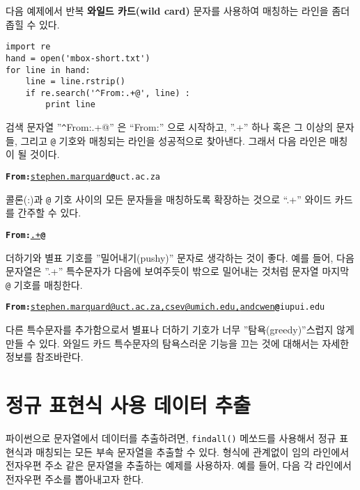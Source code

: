 다음 예제에서 반복 {\bf 와일드 카드(wild card)} 문자를 사용하여 매칭하는 라인을 좀더 좁힐 수 있다.

\beforeverb
\begin{verbatim}
import re
hand = open('mbox-short.txt')
for line in hand:
    line = line.rstrip()
    if re.search('^From:.+@', line) :
        print line
\end{verbatim}
\afterverb
%

검색 문자열 ''{\verb"^"}From:.+@'' 은 ``From:'' 으로 시작하고, ''.+'' 하나 혹은 그 이상의 문자들, 그리고 {\verb"@"} 기호와 매칭되는 라인을 성공적으로 찾아낸다.
그래서 다음 라인은 매칭이 될 것이다.

\beforeverb
\begin{alltt}
{\bf From:}\underline{ stephen.marquard}{\bf @}uct.ac.za
\end{alltt}
\afterverb

콜론(:)과  {\verb"@"} 기호 사이의 모든 문자들을 매칭하도록 확장하는 것으로 ``.+'' 와이드 카드를 간주할 수 있다.

\beforeverb
\begin{alltt}
{\bf From:}\underline{.+}{\bf @}
\end{alltt}
\afterverb

더하기와 별표 기호를 ''밀어내기(pushy)'' 문자로 생각하는 것이 좋다. 
예를 들어, 다음 문자열은 ''.+'' 특수문자가 다음에 보여주듯이 밖으로 밀어내는 것처럼 문자열 마지막 {\verb"@"} 기호를 매칭한다.

\beforeverb
\begin{alltt}
{\bf From:}\underline{ stephen.marquard@uct.ac.za, csev@umich.edu, and cwen}{\bf @}iupui.edu
\end{alltt}
\afterverb

다른 특수문자를 추가함으로서 별표나 더하기 기호가 너무 ''탐욕(greedy)''스럽지 않게 만들 수 있다.
와일드 카드 특수문자의 탐욕스러운 기능을 끄는 것에 대해서는 자세한 정보를 참조바란다. 


\section{정규 표현식 사용 데이터 추출}

파이썬으로 문자열에서 데이터를 추출하려면, {\tt findall()} 메쏘드를 사용해서 정규 표현식과 매칭되는 모든 부속 문자열을 추출할 수 있다.
형식에 관계없이 임의 라인에서 전자우편 주소 같은 문자열을 추출하는 예제를 사용하자.
예를 들어, 다음 각 라인에서 전자우편 주소를 뽑아내고자 한다.

